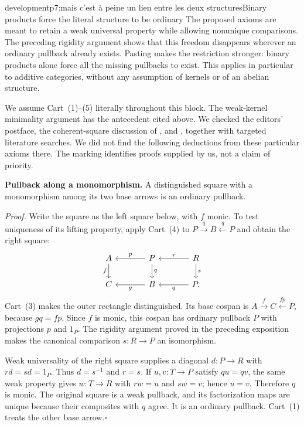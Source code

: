 \begin{dcomment}{development}{p7:mais c'est à peine un lien entre les deux structures}{Binary products force the literal structure to be ordinary}
The proposed axioms are meant to retain a weak universal property while allowing nonunique comparisons. The preceding rigidity argument shows that this freedom disappears wherever an ordinary pullback already exists. Pasting makes the restriction stronger: binary products alone force all the missing pullbacks to exist. This applies in particular to additive categories, without any assumption of kernels or of an abelian structure.

We assume Cart~(1)--(5) literally throughout this block. The weak-kernel minimality argument has the antecedent cited above. We checked the editors' postface, the coherent-square discussion of \citet[\S3]{Groth2013}, and \citet[\S1]{Krause2016FlatCovers}, together with targeted literature searches. We did not find the following deductions from these particular axioms there. The marking identifies proofs supplied by us, not a claim of priority.

\textbf{Pullback along a monomorphism.}\ours\quad
A distinguished square with a monomorphism among its two base arrows is an ordinary pullback.

\emph{Proof.} Write the square as the left square below, with $f$ monic. To test uniqueness of its lifting property, apply Cart~(4) to $P\xrightarrow qB\xleftarrow qP$ and obtain the right square:
\[
\begin{tikzcd}[column sep=large]
A\ar[d,"f"'] & P\ar[l,"p"']\ar[d,"q"]
 & R\ar[l,"r"']\ar[d,"s"]\\
C & B\ar[l,"g"] & P\ar[l,"q"] .
\end{tikzcd}
\]
Cart~(3) makes the outer rectangle distinguished. Its base cospan is $A\xrightarrow f C\xleftarrow{fp}P$, because $gq=fp$. Since $f$ is monic, this cospan has ordinary pullback $P$ with projections $p$ and $1_P$. The rigidity argument proved in the preceding exposition makes the canonical comparison $s:R\to P$ an isomorphism.

Weak universality of the right square supplies a diagonal $d:P\to R$ with $rd=sd=1_P$. Thus $d=s^{-1}$ and $r=s$. If $u,v:T\to P$ satisfy $qu=qv$, the same weak property gives $w:T\to R$ with $rw=u$ and $sw=v$; hence $u=v$. Therefore $q$ is monic. The original square is a weak pullback, and its factorization maps are unique because their composites with $q$ agree. It is an ordinary pullback. Cart~(1) treats the other base arrow.\hfill$\square$


\end{dcomment}
